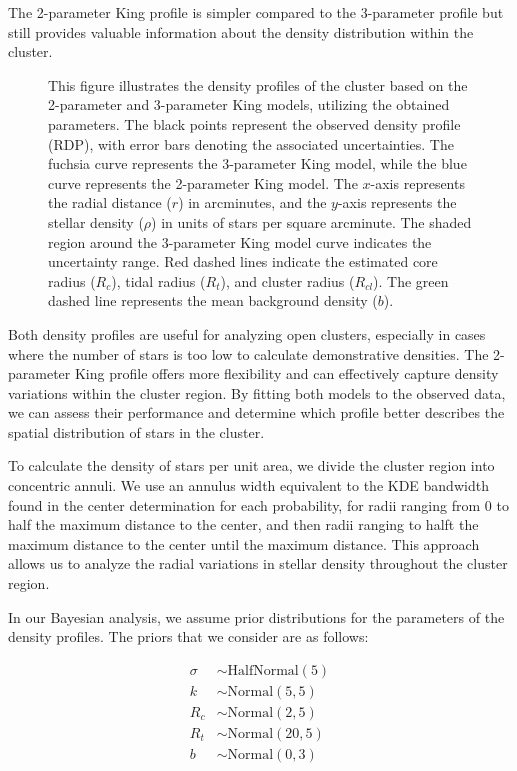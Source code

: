 \documentclass[fleqn,usenatbib,usedcolumn,useAMS]{mnras}
\begin{document}
The 2-parameter King profile is simpler compared to the 3-parameter profile but still provides valuable information about the density distribution within the cluster.

\begin{figure}
	\centering
    \caption{This figure illustrates the density profiles of the cluster based on the 2-parameter and 3-parameter King models, utilizing the obtained parameters. The black points represent the observed density profile (RDP), with error bars denoting the associated uncertainties. The fuchsia curve represents the 3-parameter King model, while the blue curve represents the 2-parameter King model. The $x$-axis represents the radial distance ($r$) in arcminutes, and the $y$-axis represents the stellar density ($\rho$) in units of stars per square arcminute. The shaded region around the 3-parameter King model curve indicates the uncertainty range. Red dashed lines indicate the estimated core radius ($R_c$), tidal radius ($R_t$), and cluster radius ($R_{cl}$). The green dashed line represents the mean background density ($b$).}
    \label{fig:king}
\end{figure}

Both density profiles are useful for analyzing open clusters, especially in cases where the number of stars is too low to calculate demonstrative densities. The 2-parameter King profile offers more flexibility and can effectively capture density variations within the cluster region. By fitting both models to the observed data, we can assess their performance and determine which profile better describes the spatial distribution of stars in the cluster.

To calculate the density of stars per unit area, we divide the cluster region into concentric annuli. We use an annulus width equivalent to the KDE bandwidth found in the center determination for each probability, for radii ranging from 0 to half the maximum distance to the center, and then radii ranging to halft the maximum distance to the center until the maximum distance. This approach allows us to analyze the radial variations in stellar density throughout the cluster region.

In our Bayesian analysis, we assume prior distributions for the parameters of the density profiles. The priors that we consider are as follows:

\begin{align*}
\sigma & \sim \textrm{HalfNormal}(5) \\
k & \sim \textrm{Normal}(5, 5) \\
R_c & \sim \textrm{Normal}(2, 5) \\
R_t & \sim \textrm{Normal}(20, 5) \\
b & \sim \textrm{Normal}(0, 3)
\end{align*}
\end{document}
